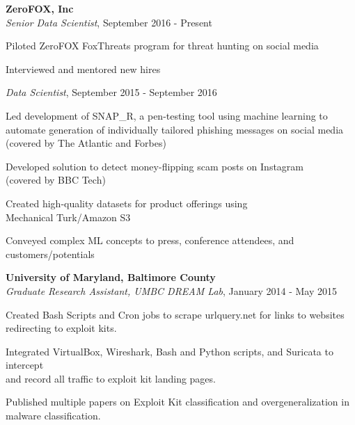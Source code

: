\medskip
\atab \textbf{ZeroFOX, Inc}\\
\btab \textit{Senior Data Scientist}, September 2016 - Present\\
\begin{my_list}
\item Piloted ZeroFOX FoxThreats program for threat hunting on social media
\item Interviewed and mentored new hires
\end{my_list}
\btab \textit{Data Scientist}, September 2015 - September 2016\\
\begin{my_list}
\item Led development of SNAP\_R, a pen-testing tool using machine learning to\\ \tab \tab automate generation of individually tailored phishing messages on social media\\ \tab \tab(covered by The Atlantic and Forbes)
\item Developed solution to detect money-flipping scam posts on Instagram\\ \tab \tab (covered by BBC Tech)
\item Created high-quality datasets for product offerings using\\ \tab \tab Mechanical Turk/Amazon S3
\item Conveyed complex ML concepts to press, conference attendees, and\\ \tab \tab customers/potentials
\end{my_list}

\medskip
\atab \textbf{University of Maryland, Baltimore County}\\
\btab \textit{Graduate Research Assistant, UMBC DREAM Lab}, January 2014 - May 2015\\
\begin{my_list}
\item Created Bash Scripts and Cron jobs to scrape urlquery.net for links to websites\\ \tab \tab redirecting to exploit kits.
\item Integrated VirtualBox, Wireshark, Bash and Python scripts, and Suricata to intercept\\ \tab \tab and record all traffic to exploit kit landing pages.
\item Published multiple papers on Exploit Kit classification and overgeneralization in\\ \tab \tab malware classification.
\end{my_list}

